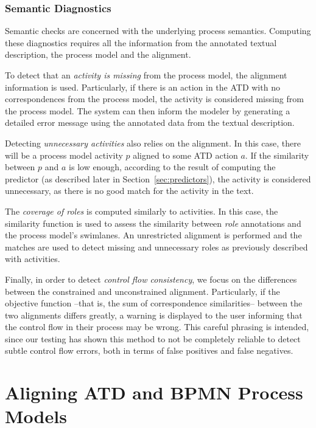 \subsubsection*{Semantic Diagnostics}
Semantic checks are concerned with the underlying process
semantics. Computing these diagnostics requires all the information from the
annotated textual description, the process model and the alignment.

To detect that an \emph{activity is missing} from the process model, the alignment
information is used. Particularly, if there is an action in the ATD with no
correspondences from the process model, the activity is considered missing from
the process model. The system can then inform the modeler by generating a
detailed error message using the annotated data from the textual description.

Detecting \emph{unnecessary activities} also relies on the alignment. In this case,
there will be a process model activity $p$ aligned to some ATD action $a$. If the
similarity between $p$ and $a$ is low enough, according to the result of
computing the predictor (as described later in Section~\ref{sec:predictors}), the
activity is considered unnecessary, as there is no good match for the activity
in the text.

The \emph{coverage of roles} is computed similarly to activities. In this case, the
similarity function is used to assess the similarity between \emph{role}
annotations and the process model's swimlanes. An unrestricted alignment is
performed and the matches are used to detect missing and unnecessary roles as
previously described with activities.

Finally, in order to detect \emph{control flow consistency}, we focus on the
differences between the constrained and unconstrained alignment. Particularly,
if the objective function --that is, the sum of correspondence similarities--
between the two alignments differs greatly, a warning is displayed to the user
informing that the control flow in their process may be wrong. This careful
phrasing is intended, since our testing has shown this method to not be
completely reliable to detect subtle control flow errors, both in terms of
false positives and false negatives.

\section{Aligning ATD and BPMN Process Models}
\label{sec:aligning_atd_bpmn}


